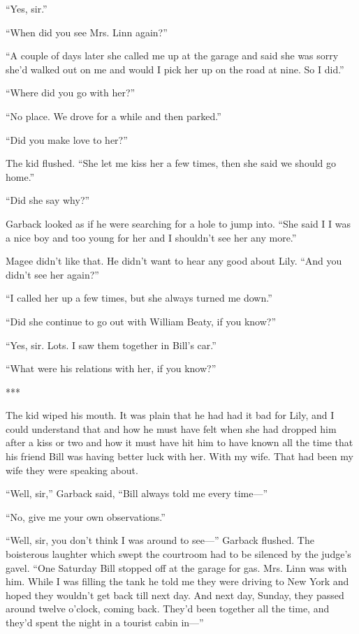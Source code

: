 \documentclass{novel}
\begin{document}
“Yes, sir.”

“When did you see Mrs. Linn again?”

“A couple of days later she called me up at the garage and said she was sorry she’d walked out on me and would I pick her up on the road at nine. So I did.”

“Where did you go with her?”

“No place. We drove for a while and then parked.”

“Did you make love to her?”

The kid flushed. “She let me kiss her a few times, then she said we should go home.”

“Did she say why?”

Garback looked as if he were searching for a hole to jump into. “She said I I was a nice boy and too young for her and I shouldn’t see her any more.”

Magee didn’t like that. He didn’t want to hear any good about Lily. “And you didn’t see her again?”

“I called her up a few times, but she always turned me down.”

“Did she continue to go out with William Beaty, if you know?”

“Yes, sir. Lots. I saw them together in Bill’s car.”

“What were his relations with her, if you know?”

***

The kid wiped his mouth. It was plain that he had had it bad for Lily, and I could understand that and how he must have felt when she had dropped him after a kiss or two and how it must have hit him to have known all the time that his friend Bill was having better luck with her. With my wife. That had been my wife they were speaking about.

“Well, sir,” Garback said, “Bill always told me every time—”

“No, give me your own observations.”

“Well, sir, you don’t think I was around to see—” Garback flushed. The boisterous laughter which swept the courtroom had to be silenced by the judge’s gavel. “One Saturday Bill stopped off at the garage for gas. Mrs. Linn was with him. While I was filling the tank he told me they were driving to New York and hoped they wouldn’t get back till next day. And next day, Sunday, they passed around twelve o’clock, coming back. They’d been together all the time, and they’d spent the night in a tourist cabin in—”
\end{document}
